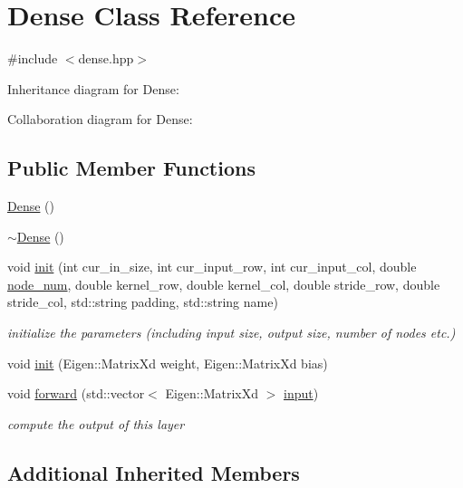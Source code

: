 \hypertarget{class_dense}{}\section{Dense Class Reference}
\label{class_dense}


{\ttfamily \#include $<$dense.\+hpp$>$}



Inheritance diagram for Dense\+:


Collaboration diagram for Dense\+:
\subsection*{Public Member Functions}
\begin{DoxyCompactItemize}
\item 
\hyperlink{class_dense_a484feaf4728dea6894e1eae9078d0aa1}{Dense} ()
\item 
\hyperlink{class_dense_a7f761043ff8fea17708fecc7bba34d8c}{$\sim$\+Dense} ()
\item 
void \hyperlink{class_dense_a681837f518909d237e26aa195274218c}{init} (int cur\+\_\+in\+\_\+size, int cur\+\_\+input\+\_\+row, int cur\+\_\+input\+\_\+col, double \hyperlink{class_layer_a2f19878482d098654fb084b9c21b72ed}{node\+\_\+num}, double kernel\+\_\+row, double kernel\+\_\+col, double stride\+\_\+row, double stride\+\_\+col, std\+::string padding, std\+::string name)
\begin{DoxyCompactList}\small\item\em initialize the parameters (including input size, output size, number of nodes etc.) \end{DoxyCompactList}\item 
void \hyperlink{class_dense_a4f35191bbb7ad43770fed2621439e992}{init} (Eigen\+::\+Matrix\+Xd weight, Eigen\+::\+Matrix\+Xd bias)
\item 
void \hyperlink{class_dense_a8352bde317b3f33c033a36ce9b9e3c0e}{forward} (std\+::vector$<$ Eigen\+::\+Matrix\+Xd $>$ \hyperlink{class_layer_a5213366d9a5a7317c5d40d9efdcfa623}{input})
\begin{DoxyCompactList}\small\item\em compute the output of this layer \end{DoxyCompactList}\end{DoxyCompactItemize}
\subsection*{Additional Inherited Members}



